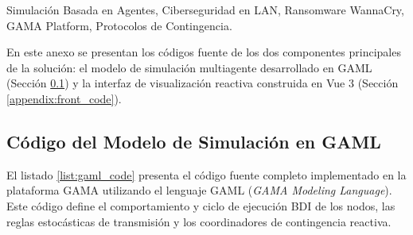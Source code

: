 \documentclass{ieeeaccess}
\begin{document}
\begin{keywords}
Simulación Basada en Agentes, Ciberseguridad en LAN, Ransomware WannaCry, GAMA Platform, Protocolos de Contingencia.
\end{keywords}

\maketitle













\newpage
\onecolumn
{}
\label{appendix:source_code}
En este anexo se presentan los códigos fuente de los dos componentes principales de la solución: el modelo de simulación multiagente desarrollado en GAML (Sección \ref{appendix:gaml_code}) y la interfaz de visualización reactiva construida en Vue 3 (Sección \ref{appendix:front_code}).

\subsection{Código del Modelo de Simulación en GAML}
\label{appendix:gaml_code}
El listado \ref{list:gaml_code} presenta el código fuente completo implementado en la plataforma GAMA utilizando el lenguaje GAML (\textit{GAMA Modeling Language}). Este código define el comportamiento y ciclo de ejecución BDI de los nodos, las reglas estocásticas de transmisión y los coordinadores de contingencia reactiva.
\end{document}
